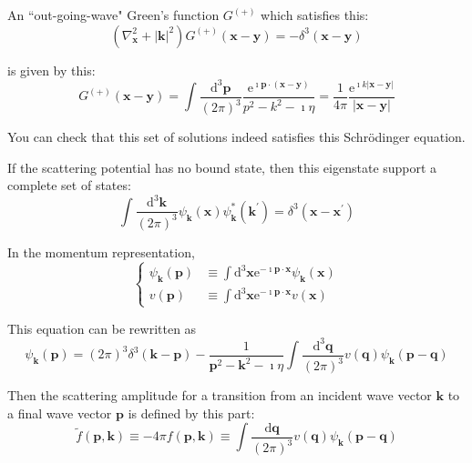 An ``out-going-wave" Green's function $G^{(+)}$ which satisfies this:
\begin{equation*} \label{Eqs2.7.A.3} \tag{2.7.A.3}
\left( \nabla_{\mathbf{x}}^2 + {|\mathbf{k}|}^2 \right) G^{(+)}(\mathbf{x}-\mathbf{y}) = - \delta^3 (\mathbf{x}-\mathbf{y}) \end{equation*}

is given by this:
\begin{equation*} \label{Eqs2.7.A.4} \tag{2.7.A.4}
G^{(+)}(\mathbf{x}-\mathbf{y}) = \int \frac{\mathrm{d}^3 \mathbf{p}}{(2 \pi)^3} \frac{\mathrm{e}^{\imath \mathbf{p} \cdot (\mathbf{x}-\mathbf{y})}}{p^2-k^2-\imath \eta}
= \frac{1}{4 \pi} \frac{\mathrm{e}^{\imath k |\mathbf{x}-\mathbf{y}|}}{|\mathbf{x}-\mathbf{y}|}
\end{equation*}

You can check that this set of solutions indeed satisfies this Schr\"odinger equation.

If the scattering potential has no bound state, then this eigenstate support a complete set of states:
\begin{equation*} \label{Eqs2.7.A.5} \tag{2.7.A.5}
\int \frac{\mathrm{d}^3 \mathbf{k}}{(2\pi)^3} \psi_{\mathbf{k}} (\mathbf{x}) \psi_{\mathbf{k}}^* (\mathbf{k}^{'}) = \delta^3 (\mathbf{x}-\mathbf{x}^{'})
\end{equation*}

In the momentum representation,
\begin{equation*} \label{Eqs2.7.A.6} \tag{2.7.A.6}
\left\{ \begin{split}
\psi_{\mathbf{k}} (\mathbf{p}) &\equiv \int \mathrm{d}^3 \mathbf{x} \mathrm{e}^{-\imath \mathbf{p} \cdot \mathbf{x}} \psi_{\mathbf{k}} (\mathbf{x})\\
v(\mathbf{p}) & \equiv \int \mathrm{d}^3 \mathbf{x} \mathrm{e}^{-\imath \mathbf{p} \cdot \mathbf{x}} v(\mathbf{x})
\end{split} \right.
\end{equation*}

This equation can be rewritten as
\begin{equation*} \label{Eqs2.7.A.7} \tag{2.7.A.7}
\psi_{\mathbf{k}}(\mathbf{p}) = (2\pi) ^3 \delta^3(\mathbf{k}-\mathbf{p}) - \frac{1}{\mathbf{p}^2 - \mathbf{k}^2 - \imath \eta} \int \frac{ \mathrm{d}^3 \mathbf{q}}{(2\pi)^3} v(\mathbf{q}) \psi_{\mathbf{k}}(\mathbf{p}-\mathbf{q})
\end{equation*}

Then the scattering amplitude for a transition from an incident wave vector $\mathbf{k}$ to a final wave vector $\mathbf{p}$ is defined by this part:
\begin{equation*} \label{Eqs2.7.A.8} \tag{2.7.A.8}
\tilde{f}(\mathbf{p},\mathbf{k}) \equiv -4 \pi f(\mathbf{p},\mathbf{k}) \equiv \int \frac{\mathrm{d}\mathbf{q}}{(2\pi)^3} v(\mathbf{q}) \psi_{\mathbf{k}}(\mathbf{p}-\mathbf{q})
\end{equation*}

